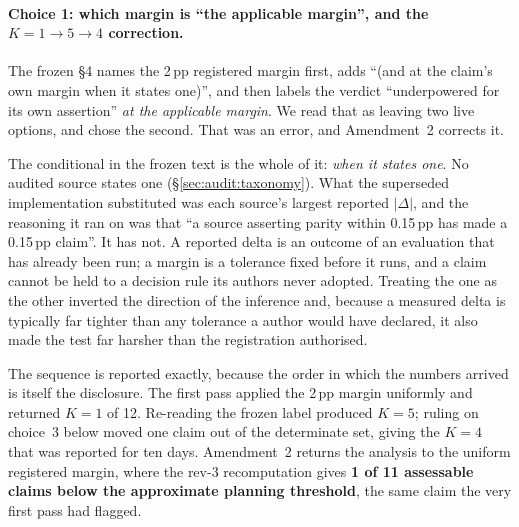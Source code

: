 \paragraph{Choice 1: which margin is ``the applicable margin'', and the
$K = 1 \to 5 \to 4$ correction.}
%
The frozen §4 names the 2\,pp registered margin first, adds ``(and at the
claim's own margin when it states one)'', and then labels the verdict
``underpowered for its own assertion'' \emph{at the applicable margin}. We read
that as leaving two live options, and chose the second. That was an error, and
Amendment~2 corrects it.

The conditional in the frozen text is the whole of it: \emph{when it states
one}. No audited source states one (\S\ref{sec:audit:taxonomy}). What the
superseded implementation substituted was each source's largest reported
$|\Delta|$, and the reasoning it ran on was that ``a source asserting parity
within 0.15\,pp has made a 0.15\,pp claim''. It has not. A reported delta is an
outcome of an evaluation that has already been run; a margin is a tolerance
fixed before it runs, and a claim cannot be held to a decision rule its authors
never adopted. Treating the one as the other inverted the direction of the
inference and, because a measured delta is typically far tighter than any
tolerance a author would have declared, it also made the test far harsher than
the registration authorised.

The sequence is reported exactly, because the order in which the numbers arrived
is itself the disclosure. The first pass applied the 2\,pp margin uniformly and
returned $K = 1$ of 12. Re-reading the frozen label produced $K = 5$; ruling on
choice~3 below moved one claim out of the determinate set, giving the $K = 4$
that was reported for ten days. Amendment~2 returns the analysis to the uniform
registered margin, where the rev-3 recomputation gives \textbf{1 of 11
assessable claims below the approximate planning threshold}, the same claim the
very first pass had flagged.

